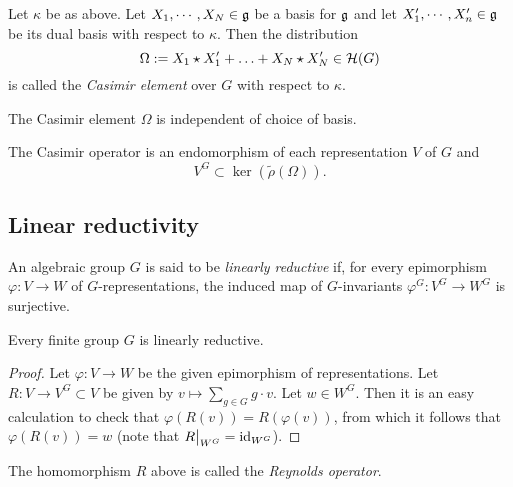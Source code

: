 \documentclass[11pt, english]{article}
\begin{document}
\begin{defi}

Let $\kappa$ be as above. Let $X_1,\cdots,X_N \in \mathfrak g$ be a basis for $\mathfrak g$ and let $X_1',\cdots,X_n' \in \mathfrak g$ be its dual basis with respect to $\kappa$. Then the distribution
$$
\Omega := X_1 \star X_1' + \ldots + X_N \star X_N' \in \mathcal{H}(G)
$$
is called the \emph{Casimir element} over $G$ with respect to $\kappa$.
\end{defi}

\begin{prop}
 The Casimir element $\Omega$ is independent of choice of basis.
\end{prop}

\begin{corr}
 The Casimir operator is an endomorphism of each representation $V$ of $G$ and 
$$
V^G \subset \ker ( \tilde \rho(\Omega)).
$$
\end{corr}


\subsection{Linear reductivity}

\begin{defi}
An algebraic group $G$ is said to be \emph{linearly reductive} if, for every epimorphism $\varphi:V \to W$ of $G$-representations, the induced map of $G$-invariants $\varphi^G:V^G \to W^G$ is surjective.
\end{defi}

\begin{prop}
Every finite group $G$ is linearly reductive.
\end{prop}

\begin{proof}
Let $\varphi: V \to W$ be the given epimorphism of representations. Let $ R:V \to V^G \subset V$ be given by $v \mapsto \sum_{g \in G} g\cdot v$. Let $w \in W^G$. Then it is an easy calculation to check that $\varphi(R(v))=R(\varphi(v))$, from which it follows that $\varphi(R(v))=w$ (note that $\restr{R}{W^G}=\id_{W^G}$).
\end{proof}

The homomorphism $R$ above is called the \emph{Reynolds operator}.
\end{document}
